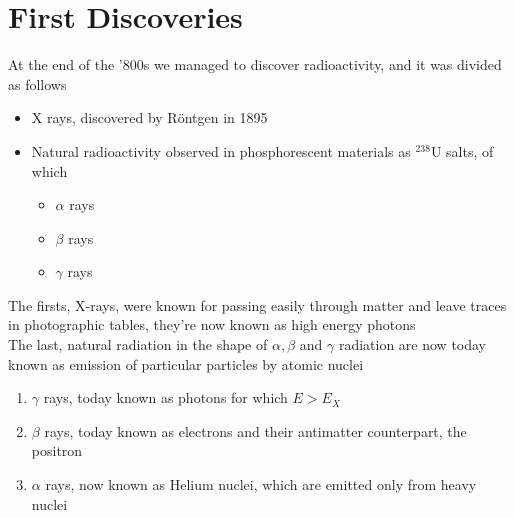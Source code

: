 \documentclass[../qm.tex]{subfiles}
\begin{document}
\section{First Discoveries}
At the end of the '800s we managed to discover radioactivity, and it was divided as follows
\begin{itemize}
\item X rays, discovered by Röntgen in 1895
\item Natural radioactivity observed in phosphorescent materials as ${}^{238}$U salts, of which
	\begin{itemize}
	\item $\alpha$ rays
	\item $\beta$ rays
	\item $\gamma$ rays
	\end{itemize}
\end{itemize}
The firsts, X-rays, were known for passing easily through matter and leave traces in photographic tables, they're now known as high energy photons\\
The last, natural radiation in the shape of $\alpha,\beta$ and $\gamma$ radiation are now today known as emission of particular particles by atomic nuclei
\begin{enumerate}
\item $\gamma$ rays, today known as photons for which $E>E_X$
\item $\beta$ rays, today known as electrons and their antimatter counterpart, the positron
\item $\alpha$ rays, now known as Helium nuclei, which are emitted only from heavy nuclei
\end{enumerate}
\end{document}

